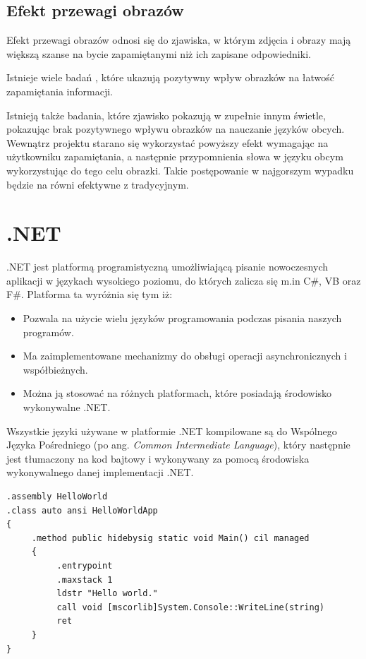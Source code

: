 \section{Efekt przewagi obrazów}

Efekt przewagi obrazów odnosi się do zjawiska, w którym zdjęcia i obrazy mają większą szanse na bycie zapamiętanymi niż ich zapisane odpowiedniki. 

Istnieje wiele badań \cite{PicturesRocks}\cite{SuperPictures}, które ukazują pozytywny wpływ obrazków na łatwość zapamiętania informacji. 

Istnieją także badania, które zjawisko pokazują w zupełnie innym świetle, pokazując brak pozytywnego wpływu obrazków na nauczanie języków obcych\cite{OverConfidence}.
\\
Wewnątrz projektu starano się wykorzystać powyższy efekt wymagając na użytkowniku zapamiętania, a następnie przypomnienia słowa w języku obcym wykorzystując do tego celu obrazki. Takie postępowanie w najgorszym wypadku będzie na równi efektywne z tradycyjnym.







{\let\cleardoublepage\relax \chapter{.NET}}


.NET jest platformą programistyczną umożliwiającą pisanie nowoczesnych aplikacji w językach wysokiego poziomu, do których zalicza się m.in C\#, VB oraz F\#. Platforma ta wyróżnia się tym iż:
\begin{itemize}
	\item Pozwala na użycie wielu języków programowania podczas pisania naszych programów.
	\item Ma zaimplementowane mechanizmy do obsługi operacji asynchronicznych i współbieżnych.
	\item Można ją stosować na różnych platformach, które posiadają środowisko wykonywalne .NET.
\end{itemize}
Wszystkie języki używane w platformie .NET kompilowane są do Wspólnego Języka Pośredniego (po ang. \textit{Common Intermediate Language}), który następnie jest tłumaczony na kod bajtowy i wykonywany za pomocą środowiska wykonywalnego danej implementacji .NET.

\begin{minipage}{\linewidth}
\begin{lstlisting}[frame=single, numbers=none,captionpos=b, 
caption={Przykładowy kod aplikacji "Hello World" w języku CIL}]
.assembly HelloWorld
.class auto ansi HelloWorldApp
{
     .method public hidebysig static void Main() cil managed
     {
          .entrypoint
          .maxstack 1
          ldstr "Hello world."
          call void [mscorlib]System.Console::WriteLine(string)
          ret
     }
}
\end{lstlisting}
\end{minipage}

